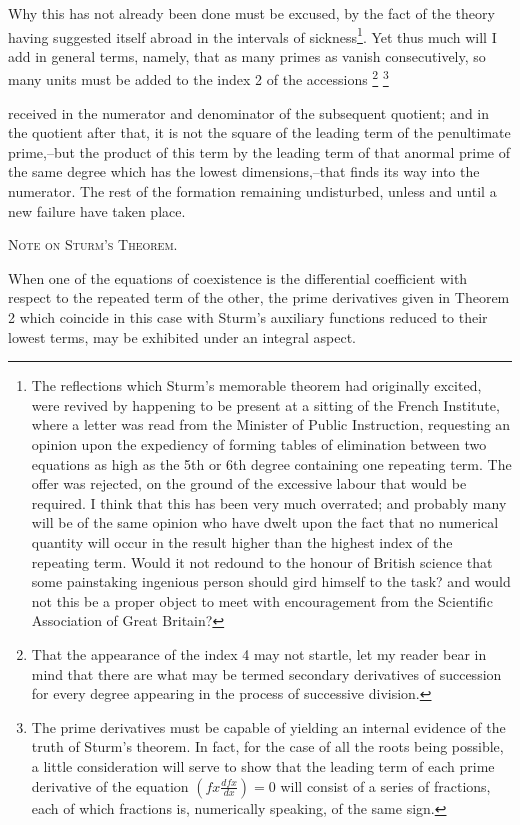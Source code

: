 \documentclass[11pt]{article}
\newcommand{\sourcepage}[1]{\marginpar{\scriptsize p.~#1}}
\begin{document}
Why this has not already been done must be excused, by the fact of the theory having suggested itself abroad in the intervals of sickness\footnote{The reflections which Sturm's memorable theorem had originally excited, were revived by happening to be present at a sitting of the French Institute, where a letter was read from the Minister of Public Instruction, requesting an opinion upon the expediency of forming tables of elimination between two equations as high as the 5th or 6th degree containing one repeating term. The offer was rejected, on the ground of the excessive labour that would be required. I think that this has been very much overrated; and probably many will be of the same opinion who have dwelt upon the fact that no numerical quantity will occur in the result higher than the highest index of the repeating term. Would it not redound to the honour of British science that some painstaking ingenious person should gird himself to the task? and would not this be a proper object to meet with encouragement from the Scientific Association of Great Britain?}. Yet thus much will I add in general terms, namely, that as many primes as vanish consecutively, so many units must be added to the index 2 of the accessions
\footnote{That the appearance of the index 4 may not startle, let my reader bear in mind that there are what may be termed secondary derivatives of succession for every degree appearing in the process of successive division.}
\footnote{The prime derivatives must be capable of yielding an internal evidence of the truth of Sturm's theorem. In fact, for the case of all the roots being possible, a little consideration will serve to show that the leading term of each prime derivative of the equation \(\left(fx\frac{dfx}{dx}\right)=0\) will consist of a series of fractions, each of which fractions is, numerically speaking, of the same sign.}

\sourcepage{45}
received in the numerator and denominator of the subsequent quotient; and in the quotient after that, it is not the square of the leading term of the penultimate prime,--but the product of this term by the leading term of that anormal prime of the same degree which has the lowest dimensions,--that finds its way into the numerator. The rest of the formation remaining undisturbed, unless and until a new failure have taken place.

\begin{center}\scshape Note on Sturm's Theorem.\end{center}

When one of the equations of coexistence is the differential coefficient with respect to the repeated term of the other, the prime derivatives given in Theorem 2 which coincide in this case with Sturm's auxiliary functions reduced to their lowest terms, may be exhibited under an integral aspect.
\end{document}

